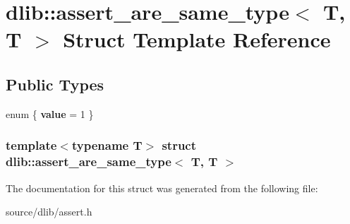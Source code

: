 \hypertarget{structdlib_1_1assert__are__same__type_3_01T_00_01T_01_4}{
\section{dlib::assert\_\-are\_\-same\_\-type$<$ T, T $>$ Struct Template Reference}
\label{structdlib_1_1assert__are__same__type_3_01T_00_01T_01_4}
}
\subsection*{Public Types}
\begin{DoxyCompactItemize}
\item 
enum \{ {\bfseries value} = 1
 \}
\end{DoxyCompactItemize}
\subsubsection*{template$<$typename T$>$ struct dlib::assert\_\-are\_\-same\_\-type$<$ T, T $>$}



The documentation for this struct was generated from the following file:\begin{DoxyCompactItemize}
\item 
source/dlib/assert.h\end{DoxyCompactItemize}
